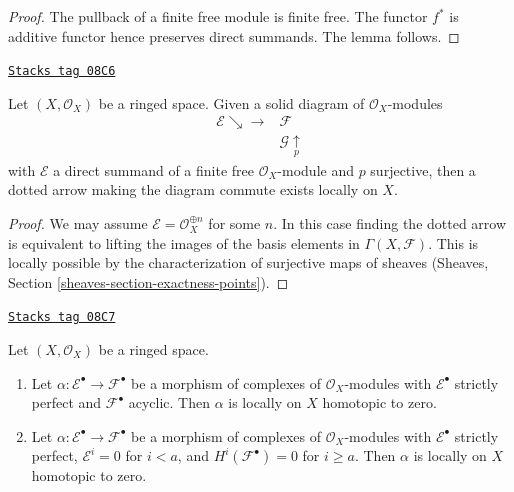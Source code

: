 \begin{proof}
The pullback of a finite free module is finite free. The functor
$f^*$ is additive functor hence preserves direct summands. The lemma follows.
\end{proof}

\begin{lemma}
\label{cohomology-lemma-local-lift-map}
\href{https://stacks.math.columbia.edu/tag/08C6}{\texttt{Stacks tag 08C6}}

Let $(X, \mathcal{O}_X)$ be a ringed space.
Given a solid diagram of $\mathcal{O}_X$-modules
$$
\begin{array}{cc}\mathcal{E} \searrow\longrightarrow & \mathcal{F} \\  & \mathcal{G} \underset{p}{\uparrow}\end{array}
$$
with $\mathcal{E}$ a direct summand of a finite free
$\mathcal{O}_X$-module and $p$ surjective, then a dotted arrow
making the diagram commute exists locally on $X$.
\end{lemma}

\begin{proof}
We may assume $\mathcal{E} = \mathcal{O}_X^{\oplus n}$ for some $n$.
In this case finding the dotted arrow is equivalent to lifting the
images of the basis elements in $\Gamma(X, \mathcal{F})$. This is
locally possible by the characterization of surjective maps of
sheaves (Sheaves, Section \ref{sheaves-section-exactness-points}).
\end{proof}

\begin{lemma}
\label{cohomology-lemma-local-homotopy}
\href{https://stacks.math.columbia.edu/tag/08C7}{\texttt{Stacks tag 08C7}}

Let $(X, \mathcal{O}_X)$ be a ringed space.
\begin{enumerate}
\item Let $\alpha : \mathcal{E}^\bullet \to \mathcal{F}^\bullet$
be a morphism of complexes of $\mathcal{O}_X$-modules
with $\mathcal{E}^\bullet$ strictly perfect and $\mathcal{F}^\bullet$
acyclic. Then $\alpha$ is locally on $X$ homotopic to zero.
\item Let $\alpha : \mathcal{E}^\bullet \to \mathcal{F}^\bullet$
be a morphism of complexes of $\mathcal{O}_X$-modules
with $\mathcal{E}^\bullet$ strictly perfect, $\mathcal{E}^i = 0$
for $i < a$, and $H^i(\mathcal{F}^\bullet) = 0$ for $i \geq a$.
Then $\alpha$ is locally on $X$ homotopic to zero.
\end{enumerate}
\end{lemma}

